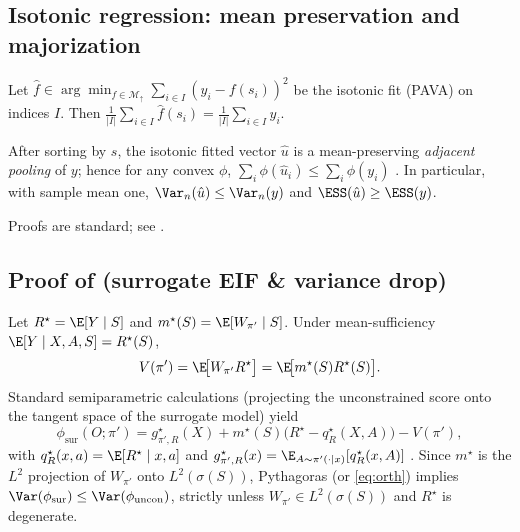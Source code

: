 \subsection{Isotonic regression: mean preservation and majorization}
\label{app:iso-facts}

\begin{lemma}
\label{lem:iso-mean}
Let $\hat f\in\arg\min_{f\in\mathcal{M}_\uparrow}\sum_{i\in I} (y_i-f(s_i))^2$ be the isotonic fit (PAVA) on indices $I$. Then $\frac{1}{|I|}\sum_{i\in I}\hat f(s_i)=\frac{1}{|I|}\sum_{i\in I}y_i$.
\end{lemma}

\begin{lemma}
\label{lem:maj}
After sorting by $s$, the isotonic fitted vector $\hat u$ is a mean-preserving \emph{adjacent pooling} of $y$; hence for any convex $\phi$, $\sum_i \phi(\hat u_i)\le \sum_i \phi(y_i)$ \citep{HardyLittlewoodPolya1952,MarshallOlkinArnold2011}. In particular, with sample mean one, $\Var_n(\hat u)\le \Var_n(y)$ and $\ESS(\hat u)\ge \ESS(y)$.
\end{lemma}

Proofs are standard; see \citet{Ayer1955PAVA,Barlow1972,RobertsonWrightDykstra1988,Banerjee2001}.

\subsection{Proof of \texorpdfstring{}{Theorem 1} (surrogate EIF \& variance drop)}
\label{app:proof-sur-eif}
Let $R^\star=\E[Y\mid S]$ and $m^\star(S)=\E[W_{\pi'}\mid S]$. Under mean-sufficiency $\E[Y\mid X,A,S]=R^\star(S)$,
\begin{equation}
V(\pi')=\E\!\big[W_{\pi'}R^\star\big]=\E\!\big[m^\star(S)R^\star(S)\big].
\end{equation}
Standard semiparametric calculations (projecting the unconstrained score onto the tangent space of the surrogate model) yield
\begin{equation}
\phi_{\mathrm{sur}}(O;\pi') = g^\star_{\pi',R}(X)+m^\star(S)\big(R^\star-q^\star_R(X,A)\big)-V(\pi'),
\end{equation}
with $q^\star_R(x,a)=\E[R^\star\mid x,a]$ and $g^\star_{\pi',R}(x)=\E_{A\sim\pi'(\cdot\mid x)}[q^\star_R(x,A)]$ \citep{Bickel1993,VaartWellner2000}. Since $m^\star$ is the $L^2$ projection of $W_{\pi'}$ onto $L^2(\sigma(S))$, Pythagoras (or \eqref{eq:orth}) implies $\Var(\phi_{\mathrm{sur}})\le \Var(\phi_{\mathrm{uncon}})$, strictly unless $W_{\pi'}\in L^2(\sigma(S))$ and $R^\star$ is degenerate.

